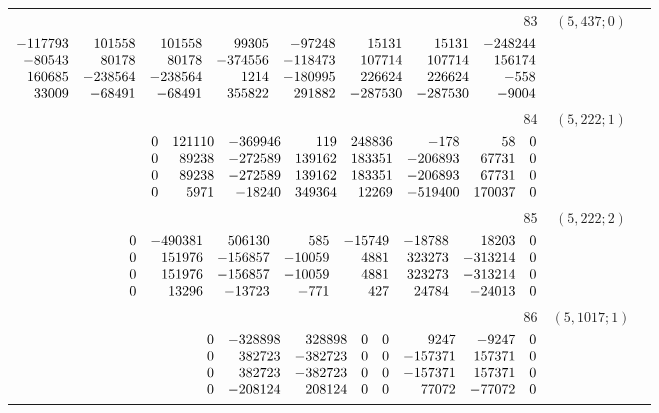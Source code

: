 \documentclass[11pt]{article}
\theoremstyle{remark}
\numberwithin{equation}{section}
\begin{document}
\begin{longtable}{rcl}
83 & $(5,437;0)$ & \begin{tabular}[t]{@{}l@{}}$w_i=\displaystyle \frac{2791812622047061657}{31607950223891414796800000000000000000}$\\[3pt]{\scriptsize$\begin{array}{@{}rrrrrrrr@{}}-117793 & 101558 & 101558 & 99305 & -97248 & 15131 & 15131 & -248244\\-80543 & 80178 & 80178 & -374556 & -118473 & 107714 & 107714 & 156174\\160685 & -238564 & -238564 & 1214 & -180995 & 226624 & 226624 & -558\\33009 & -68491 & -68491 & 355822 & 291882 & -287530 & -287530 & -9004\end{array}$}\end{tabular}\\[8pt]
84 & $(5,222;1)$ & \begin{tabular}[t]{@{}l@{}}$w_i=\displaystyle \frac{4877206172843601}{4685022726872320000000000000000000}$\\[3pt]{\scriptsize$\begin{array}{@{}rrrrrrrr@{}}0 & 121110 & -369946 & 119 & 248836 & -178 & 58 & 0\\0 & 89238 & -272589 & 139162 & 183351 & -206893 & 67731 & 0\\0 & 89238 & -272589 & 139162 & 183351 & -206893 & 67731 & 0\\0 & 5971 & -18240 & 349364 & 12269 & -519400 & 170037 & 0\end{array}$}\end{tabular}\\[8pt]
85 & $(5,222;2)$ & \begin{tabular}[t]{@{}l@{}}$w_i=\displaystyle \frac{935932178379011067}{20528165536230077984600000000000000}$\\[3pt]{\scriptsize$\begin{array}{@{}rrrrrrrr@{}}0 & -490381 & 506130 & 585 & -15749 & -18788 & 18203 & 0\\0 & 151976 & -156857 & -10059 & 4881 & 323273 & -313214 & 0\\0 & 151976 & -156857 & -10059 & 4881 & 323273 & -313214 & 0\\0 & 13296 & -13723 & -771 & 427 & 24784 & -24013 & 0\end{array}$}\end{tabular}\\[8pt]
86 & $(5,1017;1)$ & \begin{tabular}[t]{@{}l@{}}$w_i=\displaystyle \frac{6051359310862721}{5701364601295101360000000000000000}$\\[3pt]{\scriptsize$\begin{array}{@{}rrrrrrrr@{}}0 & -328898 & 328898 & 0 & 0 & 9247 & -9247 & 0\\0 & 382723 & -382723 & 0 & 0 & -157371 & 157371 & 0\\0 & 382723 & -382723 & 0 & 0 & -157371 & 157371 & 0\\0 & -208124 & 208124 & 0 & 0 & 77072 & -77072 & 0\end{array}$}\end{tabular}\\[8pt]

\end{longtable}
\end{document}
